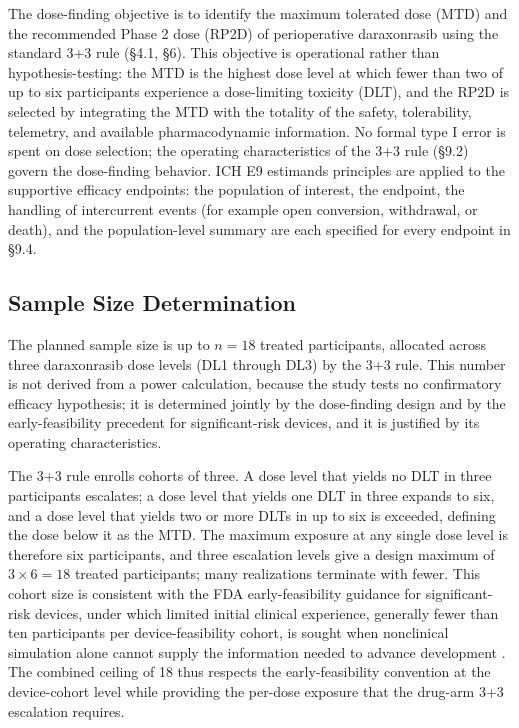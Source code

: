 The dose-finding objective is to identify the maximum tolerated dose (MTD) and the
recommended Phase 2 dose (RP2D) of perioperative daraxonrasib using the standard
3+3 rule (\S4.1, \S6). This objective is operational rather than hypothesis-testing:
the MTD is the highest dose level at which fewer than two of up to six participants
experience a dose-limiting toxicity (DLT), and the RP2D is selected by integrating
the MTD with the totality of the safety, tolerability, telemetry, and available
pharmacodynamic information. No formal type I error is spent on dose selection;
the operating characteristics of the 3+3 rule (\S9.2) govern the dose-finding
behavior. ICH E9 estimands principles are applied to the supportive efficacy
endpoints: the population of interest, the endpoint, the handling of
intercurrent events (for example open conversion, withdrawal, or death), and the
population-level summary are each specified for every endpoint in \S9.4.

\subsection{Sample Size Determination}

The planned sample size is up to $n=18$ treated participants, allocated across
three daraxonrasib dose levels (DL1 through DL3) by the 3+3 rule. This number is
not derived from a power calculation, because the study tests no confirmatory
efficacy hypothesis; it is determined jointly by the dose-finding design and by
the early-feasibility precedent for significant-risk devices, and it is justified
by its operating characteristics.

The 3+3 rule enrolls cohorts of three. A dose level that yields no DLT in three
participants escalates; a dose level that yields one DLT in three expands to six,
and a dose level that yields two or more DLTs in up to six is exceeded, defining
the dose below it as the MTD. The maximum exposure at any single dose level is
therefore six participants, and three escalation levels give a design maximum of
$3 \times 6 = 18$ treated participants; many realizations terminate with fewer.
This cohort size is consistent with the FDA early-feasibility guidance for
significant-risk devices, under which limited initial clinical experience,
generally fewer than ten participants per device-feasibility cohort, is sought
when nonclinical simulation alone cannot supply the information needed to advance
development \cite{fda2013earlyfeasibility}. The combined ceiling of 18 thus
respects the early-feasibility convention at the device-cohort level while
providing the per-dose exposure that the drug-arm 3+3 escalation requires.

